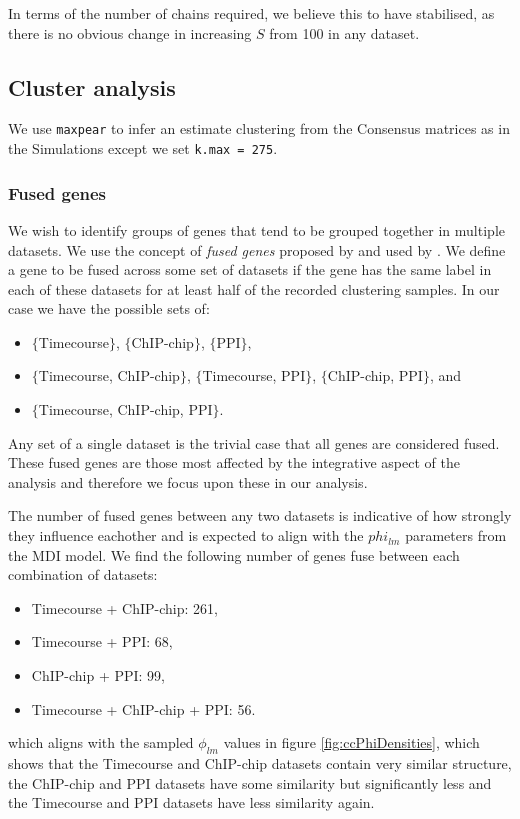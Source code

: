 \documentclass[]{article}
\begin{document}
In terms of the number of chains required, we believe this to have stabilised, as there is no obvious change in increasing $S$ from 100 in any dataset.

\subsection{Cluster analysis}
We use \texttt{maxpear} to infer an estimate clustering from the Consensus matrices as in the Simulations except we set \texttt{k.max = 275}. 



\subsubsection{Fused genes}
We wish to identify groups of genes that tend to be grouped together in
multiple datasets. We use the concept of \emph{fused genes} proposed by \cite{savage2010discovering} and used by \cite{kirk2012bayesian}. We define a gene to be fused across some set of datasets if the gene has the same label in each of these datasets for at least half of the recorded clustering samples. In our case we have the possible sets of:
\begin{itemize}
	\item $\{$Timecourse$\}$, $\{$ChIP-chip$\}$, $\{$PPI$\}$,
	\item $\{$Timecourse, ChIP-chip$\}$, $\{$Timecourse, PPI$\}$, $\{$ChIP-chip, PPI$\}$, and
	\item $\{$Timecourse, ChIP-chip, PPI$\}$.
\end{itemize}
Any set of a single dataset is the trivial case that all genes are considered fused. These fused genes are those most affected by the integrative aspect of the analysis and therefore we focus upon these in our analysis.

The number of fused genes between any two datasets is indicative of how strongly they influence eachother and is expected to align with the $phi_{lm}$ parameters from the MDI model. We find the following number of genes fuse between each combination of datasets:

\begin{itemize}
	\item Timecourse + ChIP-chip: 261,
	\item Timecourse + PPI: 68,
	\item ChIP-chip + PPI: 99,
	\item Timecourse + ChIP-chip + PPI: 56.
\end{itemize}
which aligns with the sampled $\phi_{lm}$ values in figure \ref{fig:ccPhiDensities}, which shows that the Timecourse and ChIP-chip datasets contain very similar structure, the ChIP-chip and PPI datasets have some similarity but significantly less and the Timecourse and PPI datasets have less similarity again. 
\end{document}
